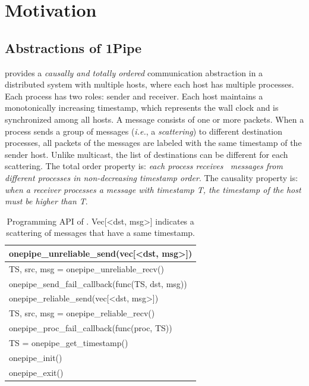 \section{Motivation}
\label{sec:motivation}

\subsection{Abstractions of 1Pipe}
\label{subsec:abstration}

\sys{} provides a \emph{causally and totally ordered} communication abstraction in a distributed system with multiple hosts, where each host has multiple processes. Each process has two roles: sender and receiver. Each host maintains a monotonically increasing timestamp, which represents the wall clock and is synchronized among all hosts. A message consists of one or more packets. When a process sends a group of messages (\emph{i.e.}, a \emph{scattering}) to different destination processes, all packets of the messages are labeled with the same timestamp of the sender host. Unlike multicast, the list of destinations can be different for each scattering. The total order property is: \emph{each process receives~ messages from different processes in non-decreasing timestamp order}. The causality property is: \emph{when a receiver processes a message with timestamp T, the timestamp of the host must be higher than T}.

\begin{table}[htbp]
\centering
\begin{tabular}{l}
	\hline
	onepipe\_unreliable\_send(vec[<dst, msg>]) \\
	\hline
	TS, src, msg = onepipe\_unreliable\_recv() \\
	\hline
	onepipe\_send\_fail\_callback(func(TS, dst, msg)) \\
	\hline
	\hline
	onepipe\_reliable\_send(vec[<dst, msg>]) \\
	\hline
	TS, src, msg = onepipe\_reliable\_recv() \\
	\hline
	onepipe\_proc\_fail\_callback(func(proc, TS)) \\
	\hline
	\hline
	TS = onepipe\_get\_timestamp() \\
	\hline
	onepipe\_init() \\
	\hline
	onepipe\_exit() \\
	\hline
\end{tabular}
\caption{Programming API of \sys{}. Vec[<dst, msg>] indicates a scattering of messages that have a same timestamp.}
\label{tab:abstraction}
\end{table}

